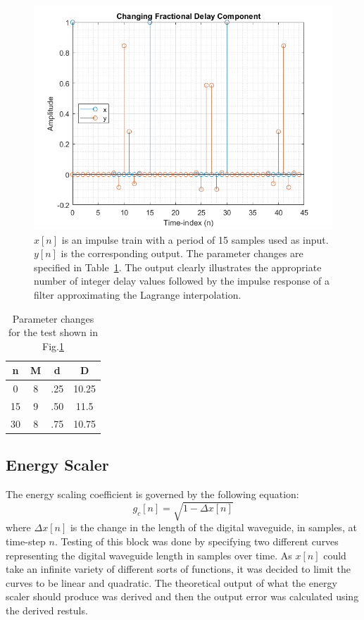 \documentclass[../main.tex]{subfiles}
\begin{document}
\begin{figure}[h]
    \centering
    \includegraphics[scale=.65]{./images/plots/LagrangeTest3.png}
    \caption{$x[n]$ is an impulse train with a period of 15 samples used as input. $y[n]$ is the corresponding output. The parameter changes are specified in Table~\ref{tab:LagrangeTest3}. The output clearly illustrates the appropriate number of integer delay values followed by the impulse response of a filter approximating the Lagrange interpolation.}
    \label{fig:LagrangeTest3}
\end{figure}

\begin{table}[h!]
    \centering
     \begin{tabular}{||c| |c |c |c|} 
         \hline
         \textbf{n} & \textbf{M} & \textbf{d} & \textbf{D} \\ [0.5ex] 
         \hline
         0 & 8 & .25 & 10.25 \\ 
         \hline
         15 & 9 & .50 & 11.5 \\
         \hline
         30 & 8 & .75 & 10.75 \\
         \hline
    \end{tabular}
    \caption{Parameter changes for the test shown in Fig.\ref{fig:LagrangeTest3}}
    \label{tab:LagrangeTest3}
\end{table}

\clearpage

\subsection{Energy Scaler}
The energy scaling coefficient is governed by the following equation:
\begin{equation}
    g_c[n] = \sqrt{1-\Delta x[n]}
\end{equation}
where $\Delta x[n]$ is the change in the length of the digital waveguide, in samples, at time-step $n$. Testing of this block was done by specifying two different curves representing the digital waveguide length in samples over time. As $x[n]$ could take an infinite variety of different sorts of functions, it was decided to limit the curves to be linear and quadratic. The theoretical output of what the energy scaler should produce was derived and then the output error was calculated using the derived restuls.
\end{document}
